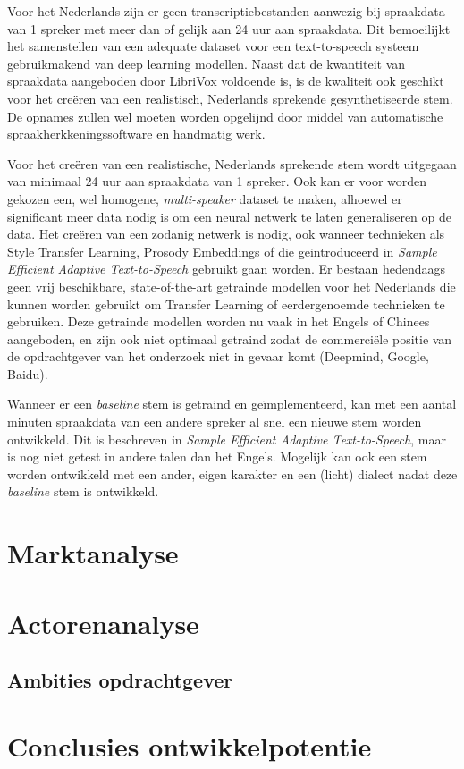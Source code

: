 Voor het Nederlands zijn er geen transcriptiebestanden aanwezig bij spraakdata van 1 spreker met meer dan of gelijk aan 24 uur aan spraakdata. Dit bemoeilijkt het samenstellen van een adequate dataset voor een text-to-speech systeem gebruikmakend van deep learning modellen. Naast dat de kwantiteit van spraakdata aangeboden door LibriVox voldoende is, is de kwaliteit ook geschikt voor het creëren van een realistisch, Nederlands sprekende gesynthetiseerde stem. De opnames zullen wel moeten worden opgelijnd door middel van automatische spraakherkkeningssoftware en handmatig werk.

Voor het creëren van een realistische, Nederlands sprekende stem wordt uitgegaan van minimaal 24 uur aan spraakdata van 1 spreker. Ook kan er voor worden gekozen een, wel homogene, \textit{multi-speaker} dataset te maken, alhoewel er significant meer data nodig is om een neural netwerk te laten generaliseren op de data. Het creëren van een zodanig netwerk is nodig, ook wanneer technieken als Style Transfer Learning, Prosody Embeddings of die geintroduceerd in \textit{Sample Efficient Adaptive Text-to-Speech} gebruikt gaan worden. Er bestaan hedendaags geen vrij beschikbare, state-of-the-art getrainde modellen voor het Nederlands die kunnen worden gebruikt om Transfer Learning of eerdergenoemde technieken te gebruiken. Deze getrainde modellen worden nu vaak in het Engels of Chinees aangeboden, en zijn ook niet optimaal getraind zodat de commerciële positie van de opdrachtgever van het onderzoek niet in gevaar komt (Deepmind, Google, Baidu).

Wanneer er een \textit{baseline} stem is getraind en geïmplementeerd, kan met een aantal minuten spraakdata van een andere spreker al snel een nieuwe stem worden ontwikkeld. Dit is beschreven in \textit{Sample Efficient Adaptive Text-to-Speech}, maar is nog niet getest in andere talen dan het Engels. Mogelijk kan ook een stem worden ontwikkeld met een ander, eigen karakter en een (licht) dialect nadat deze \textit{baseline} stem is ontwikkeld.


\section{Marktanalyse}


\section{Actorenanalyse}
\subsection{Ambities opdrachtgever}



\section{Conclusies ontwikkelpotentie}


